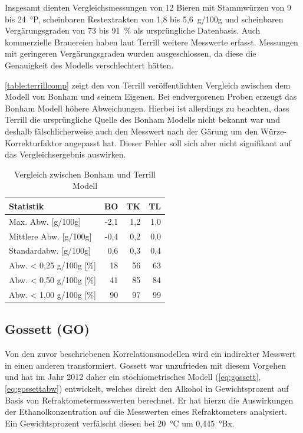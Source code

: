 \documentclass[a4paper,parskip=half]{scrartcl}
\begin{document}
Insgesamt dienten Vergleichsmessungen von 12 Bieren mit Stammwürzen
von 9 bis 24~°P, scheinbaren Restextrakten von 1,8 bis
5,6~g/100g und scheinbaren Vergärungsgraden von 73 bis 91~\%
als ursprüngliche Datenbasis. Auch kommerzielle Brauereien haben
laut Terrill weitere Messwerte erfasst. Messungen mit geringeren
Vergärungsgraden wurden ausgeschlossen, da diese die Genauigkeit des
Modells verschlechtert hätten.
\autocite{Terrill2010a,Terrill2011,Terrill2010,Terrill2013}

\autoref{table:terrillcomp} zeigt den von Terrill veröffentlichten
Vergleich zwischen dem Modell von Bonham und seinem Eigenen. Bei
endvergorenen Proben erzeugt das Bonham Modell höhere
Abweichungen. Hierbei ist allerdings zu beachten, dass
Terrill die ursprüngliche Quelle des Bonham Modells nicht bekannt war
und deshalb fälschlicherweise auch den Messwert nach der Gärung um
den Würze-Korrekturfaktor angepasst hat. Dieser Fehler soll sich
aber nicht signifikant auf das Vergleichsergebnis auswirken.
\autocite{Terrill2010a,Terrill2011,Terrill2010}

\begin{table}[h]
\centering
\begin{tabular}{lrrr}
\toprule
Statistik & BO & TK & TL \\
\midrule
Max. Abw. [g/100g] & -2,1 & 1,2 & 1,0 \\
Mittlere Abw. [g/100g] & -0,4 & 0,2 & 0,0 \\
Standardabw. [g/100g] & 0,6 & 0,3 & 0,4 \\
Abw. < 0,25 g/100g [\%] & 18 & 56 & 63 \\
Abw. < 0,50 g/100g [\%] & 41 & 85 & 84 \\
Abw. < 1,00 g/100g [\%] & 90 & 97 & 99 \\
\bottomrule
\end{tabular}
\caption{Vergleich zwischen Bonham und Terrill Modell}
\label{table:terrillcomp}
\end{table}

\subsection*{Gossett (GO)}

Von den zuvor beschriebenen Korrelationsmodellen wird ein indirekter
Messwert in einen anderen transformiert. Gossett
war unzufrieden mit diesem Vorgehen und hat im Jahr 2012 daher ein
stöchiometrisches Modell (\autoref{eq:gossett}, \autoref{eq:gossettabw})
entwickelt, welches direkt den Alkohol in Gewichtsprozent auf Basis
von Refraktometermesswerten berechnet. Er hat hierzu die Auswirkungen
der Ethanolkonzentration
auf die Messwerten eines Refraktometers analysiert. Ein Gewichtsprozent
verfälscht diesen bei 20~°C um 0,445~°Bx. 
\autocite{Gossett2012,Gossett2012a,Gossett2012b}
\end{document}
